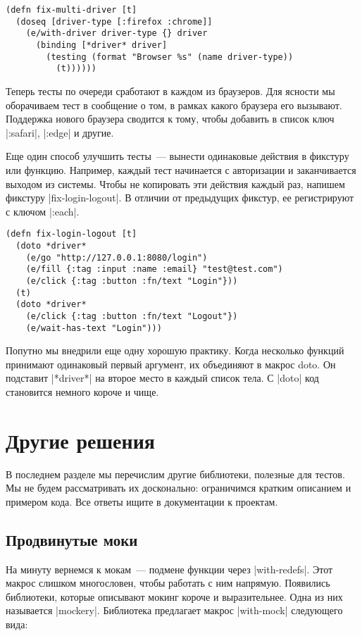 \begin{verbatim}
(defn fix-multi-driver [t]
  (doseq [driver-type [:firefox :chrome]]
    (e/with-driver driver-type {} driver
      (binding [*driver* driver]
        (testing (format "Browser %s" (name driver-type))
          (t))))))
\end{verbatim}

Теперь тесты по очереди сработают в каждом из браузеров. Для ясности мы
оборачиваем тест в сообщение о том, в рамках какого браузера его
вызывают. Поддержка нового браузера сводится к тому, чтобы добавить в список
ключ \spverb|:safari|, \spverb|:edge| и другие.

Еще один способ улучшить тесты~--- вынести одинаковые действия в фикстуру или
функцию. Например, каждый тест начинается с авторизации и заканчивается выходом
из системы. Чтобы не копировать эти действия каждый раз, напишем фикстуру
\spverb|fix-login-logout|. В отличии от предыдущих фикстур, ее регистрируют с ключом
\spverb|:each|.

\begin{verbatim}
(defn fix-login-logout [t]
  (doto *driver*
    (e/go "http://127.0.0.1:8080/login")
    (e/fill {:tag :input :name :email} "test@test.com")
    (e/click {:tag :button :fn/text "Login"}))
  (t)
  (doto *driver*
    (e/click {:tag :button :fn/text "Logout"})
    (e/wait-has-text "Login")))
\end{verbatim}

Попутно мы внедрили еще одну хорошую практику. Когда несколько функций принимают
одинаковый первый аргумент, их объединяют в макрос doto. Он подставит \spverb|*driver*|
на второе место в каждый список тела. С \spverb|doto| код становится немного короче и
чище.

\section{Другие решения}

В последнем разделе мы перечислим другие библиотеки, полезные для тестов. Мы не
будем рассматривать их досконально: ограничимся кратким описанием и примером
кода. Все ответы ищите в документации к проектам.

\subsection{Продвинутые моки}

На минуту вернемся к мокам~--- подмене функции через \spverb|with-redefs|. Этот макрос
слишком многословен, чтобы работать с ним напрямую. Появились библиотеки,
которые описывают мокинг короче и выразительнее. Одна из них называется
\spverb|mockery|. Библиотека предлагает макрос \spverb|with-mock| следующего вида:


